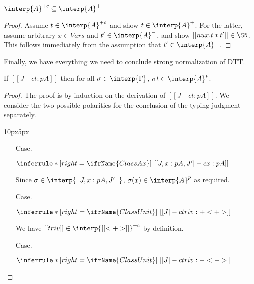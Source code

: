 \begin{lemma}
\label{lem:canonpos}
$\interp{A}^{+c}\subseteq\interp{A}^+$
\end{lemma}
\begin{proof}
Assume $t\in\interp{A}^{+c}$ and show $t\in\interp{A}^+$.
For the latter, assume arbitrary $x\in\textit{Vars}$ and $t'\in\interp{A}^-$,
and show $[[nu x . t * t']]\in\SN$.  This follows immediately
from the assumption that $t'\in\interp{A}^-$.
\end{proof}
Finally, we have everything we need to conclude strong normalization
of DTT.
\begin{thm}[Soundness]
\label{thm:sndinterp}
If $[[ J |-c t : p A]]$ then for all $\sigma\in\interp{\Gamma}$, $\sigma t\in\interp{A}^p$.
\end{thm}
\begin{proof}
The proof is by induction on the derivation of $[[ J |-c t : p A]]$.  We consider
the two possible polarities for the conclusion of the typing judgment separately.
\vspace{-25px}
\begin{changemargin}{10px}{5px}\noindent
\begin{itemize}
\item[Case.]\ 

\vspace{-.2cm}
\begin{center}
\begin{math}
\inferrule* [right=\ifrName{ClassAx}] {\ }{[[J , x : p A , J' |-c x : p A]]}
\end{math}
\end{center}

Since $\sigma\in\interp{[[J , x : p A, J']]}$, $\sigma(x)\in\interp{A}^p$ as required.

\item[Case.]\ 

\vspace{-.2cm}
\begin{center}
\begin{math}
\inferrule* [right=\ifrName{ClassUnit}] {\ }{[[J |-c triv : + < + >]]}
\end{math}
\end{center}

We have $[[triv]]\in\interp{[[<+>]]}^{+c}$ by definition.

\item[Case.]\ 

\vspace{-.2cm}
\begin{center}
\begin{math}
\inferrule* [right=\ifrName{ClassUnit}] {\ }{[[J |-c triv : - < - >]]}
\end{math}
\end{center}


\end{itemize}
\end{changemargin}
\end{proof}

